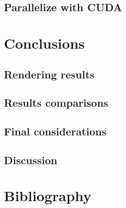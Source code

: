 \documentclass[10pt,a4paper]{article}
\begin{document}
\subsection{Parallelize with CUDA} %
\section{Conclusions} 
\subsection{Rendering results} %
\subsection{Results comparisons} %
\subsection{Final considerations} %
\subsection{Discussion} %
\section{Bibliography}
\end{document}
